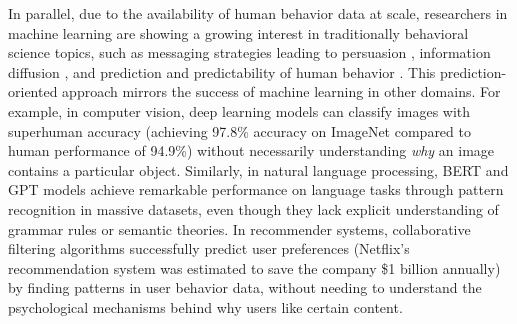 In parallel, due to the availability of human behavior data at scale, researchers in machine learning are showing a growing interest in traditionally behavioral science topics, such as messaging strategies leading to persuasion \cite{habernal2016makes,kumar2023persuasion,luu2019measuring,bhattacharya2023video}, information diffusion \cite{cheng2014can,martin2016exploring}, and prediction and predictability of human behavior \cite{choi2012predicting,song2010limits}. This prediction-oriented approach mirrors the success of machine learning in other domains. For example, in computer vision, deep learning models can classify images with superhuman accuracy (achieving 97.8\% accuracy on ImageNet compared to human performance of 94.9\%) without necessarily understanding \textit{why} an image contains a particular object. Similarly, in natural language processing, BERT and GPT models achieve remarkable performance on language tasks through pattern recognition in massive datasets, even though they lack explicit understanding of grammar rules or semantic theories. In recommender systems, collaborative filtering algorithms successfully predict user preferences (Netflix's recommendation system was estimated to save the company \$1 billion annually) by finding patterns in user behavior data, without needing to understand the psychological mechanisms behind why users like certain content.




